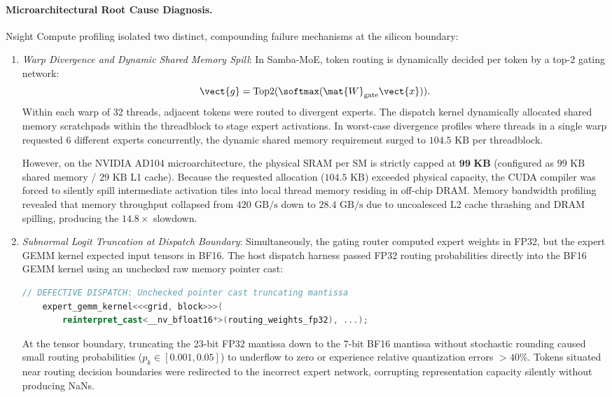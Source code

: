 \paragraph{Microarchitectural Root Cause Diagnosis.}
Nsight Compute profiling isolated two distinct, compounding failure mechanisms at the silicon boundary:
\begin{enumerate}
    \item \emph{Warp Divergence and Dynamic Shared Memory Spill}: In Samba-MoE, token routing is dynamically decided per token by a top-2 gating network:
    \begin{equation}
    \vect{g} = \operatorname{Top2}(\softmax(\mat{W}_{\text{gate}} \vect{x})).
    \end{equation}
    Within each warp of 32 threads, adjacent tokens were routed to divergent experts. The dispatch kernel dynamically allocated shared memory scratchpads within the threadblock to stage expert activations. In worst-case divergence profiles where threads in a single warp requested 6 different experts concurrently, the dynamic shared memory requirement surged to $104.5\text{ KB}$ per threadblock.
    
    However, on the NVIDIA AD104 microarchitecture, the physical SRAM per SM is strictly capped at $\mathbf{99\text{ KB}}$ (configured as $99\text{ KB}$ shared memory / $29\text{ KB}$ L1 cache). Because the requested allocation ($104.5\text{ KB}$) exceeded physical capacity, the CUDA compiler was forced to silently spill intermediate activation tiles into local thread memory residing in off-chip DRAM. Memory bandwidth profiling revealed that memory throughput collapsed from $420\text{ GB/s}$ down to $28.4\text{ GB/s}$ due to uncoalesced L2 cache thrashing and DRAM spilling, producing the $14.8\times$ slowdown.
    
    \item \emph{Subnormal Logit Truncation at Dispatch Boundary}: Simultaneously, the gating router computed expert weights in FP32, but the expert GEMM kernel expected input tensors in BF16. The host dispatch harness passed FP32 routing probabilities directly into the BF16 GEMM kernel using an unchecked raw memory pointer cast:
    \begin{lstlisting}[language=C++]
    // DEFECTIVE DISPATCH: Unchecked pointer cast truncating mantissa
    expert_gemm_kernel<<<grid, block>>>(
        reinterpret_cast<__nv_bfloat16*>(routing_weights_fp32), ...);
    \end{lstlisting}
    At the tensor boundary, truncating the 23-bit FP32 mantissa down to the 7-bit BF16 mantissa without stochastic rounding caused small routing probabilities ($p_k \in [0.001, 0.05]$) to underflow to zero or experience relative quantization errors $>40\%$. Tokens situated near routing decision boundaries were redirected to the incorrect expert network, corrupting representation capacity silently without producing NaNs.
\end{enumerate}

